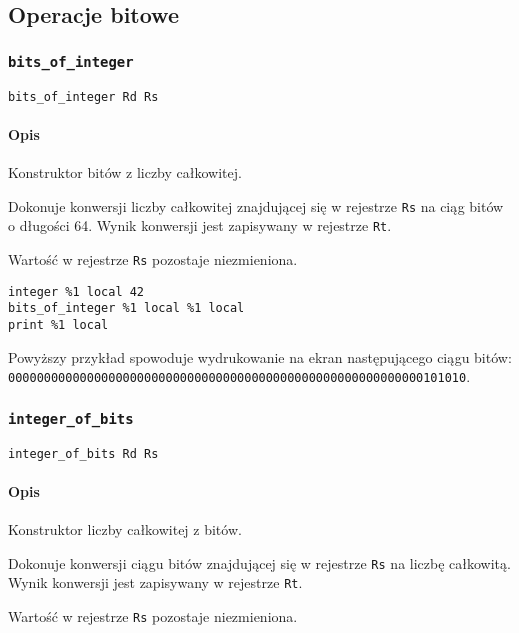 \subsection{Operacje bitowe}
\label{viua_vm_ops_bit_ops}

\subsubsection{\texttt{bits\_of\_integer}}

\begin{lstlisting}
bits_of_integer Rd Rs
\end{lstlisting}

\paragraph*{Opis} Konstruktor bitów z liczby całkowitej.

Dokonuje konwersji liczby całkowitej znajdującej się w rejestrze \texttt{Rs} na
ciąg bitów o długości 64. Wynik konwersji jest zapisywany w rejestrze
\texttt{Rt}.

Wartość w rejestrze \texttt{Rs} pozostaje niezmieniona.

\begin{lstlisting}
integer %1 local 42
bits_of_integer %1 local %1 local
print %1 local
\end{lstlisting}

Powyższy przykład spowoduje wydrukowanie na ekran następującego ciągu bitów:
\newline
\texttt{0000000000000000000000000000000000000000000000000000000000101010}.

\subsubsection{\texttt{integer\_of\_bits}}

\begin{lstlisting}
integer_of_bits Rd Rs
\end{lstlisting}

\paragraph*{Opis} Konstruktor liczby całkowitej z bitów.

Dokonuje konwersji ciągu bitów znajdującej się w rejestrze \texttt{Rs} na liczbę
całkowitą. Wynik konwersji jest zapisywany w rejestrze \texttt{Rt}.

Wartość w rejestrze \texttt{Rs} pozostaje niezmieniona.

